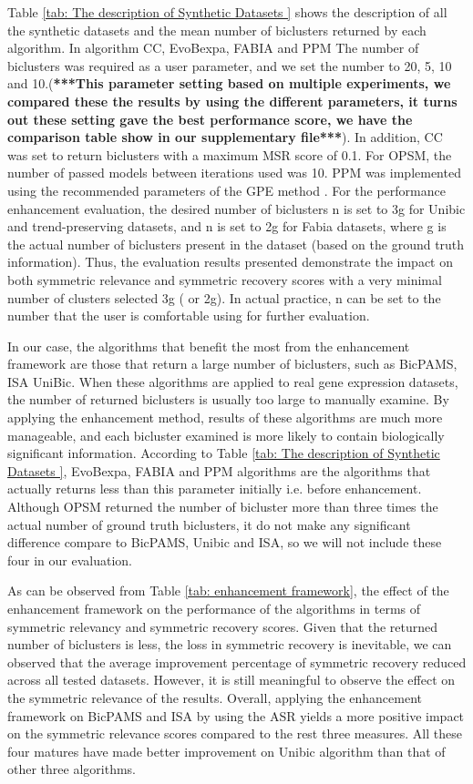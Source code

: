 Table \ref{tab: The description of Synthetic Datasets } shows the description of all the synthetic datasets and the mean number of biclusters returned by each algorithm. In algorithm CC, EvoBexpa, FABIA and PPM The number of biclusters was required as a user parameter, and we set the number to 20, 5, 10 and 10.(\textbf{***This parameter setting based on multiple experiments, we compared these the results by using the different parameters, it turns out these setting gave the best performance score, we have the comparison table show in our supplementary file***}). In addition, CC was set to return biclusters with a maximum MSR score of 0.1. For OPSM, the number of passed models between iterations used was
10. PPM was implemented using the recommended parameters of the GPE method \cite{chekouo2015thepenalized}.
For the performance enhancement evaluation, the desired number of biclusters n is set to 3g for Unibic and trend-preserving datasets, and n is set to 2g for Fabia datasets, where g is the actual number of biclusters present in the dataset (based on the ground truth information). Thus, the evaluation results presented demonstrate the impact on both symmetric relevance and symmetric recovery scores with a very minimal number of clusters selected 3g ( or 2g). In actual practice, n can be set to the number that the user is comfortable using for further evaluation. 

In our case, the algorithms that benefit the most from the enhancement framework are those that return a large number of biclusters, such as BicPAMS, ISA UniBic. When these algorithms are applied to real gene expression datasets, the number of returned biclusters is usually too large to manually examine. By applying the enhancement method, results of these algorithms
are much more manageable, and each bicluster examined is more likely to contain biologically significant information. According to Table \ref{tab: The description of Synthetic Datasets }, EvoBexpa, FABIA and PPM algorithms are the algorithms that actually returns less than this parameter initially i.e. before enhancement. Although OPSM returned the number of bicluster more than three times the actual number of ground truth biclusters, it do not make any significant difference compare to BicPAMS, Unibic and ISA, so we will not include these four in our evaluation.

As can be observed from Table \ref{tab: enhancement framework},  the effect of the enhancement framework on the performance of the algorithms in terms of symmetric relevancy and symmetric recovery scores. Given that the returned number of biclusters is less, the loss in symmetric recovery is inevitable, we can observed that the average improvement percentage of symmetric recovery reduced across all tested datasets. However, it is still meaningful to observe the effect on the symmetric relevance of the results. Overall, applying the enhancement framework on BicPAMS and ISA by using the ASR yields a more positive impact on the symmetric relevance scores compared to the rest three measures. All these four matures have made better improvement on Unibic algorithm than that of other three algorithms. 

